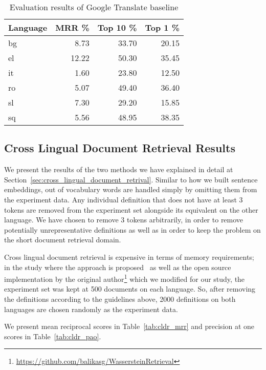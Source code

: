 \begin{table}[htbp]
    \centering
    \begin{tabulary}{1.0\linewidth}{L R R R}
        \toprule
        \textbf{Language} & \textbf{MRR \%} & \textbf{Top 10 \%} & \textbf{Top 1 \%} \\ \midrule
        bg & 8.73 & 33.70 & 20.15 \\
        el & 12.22 & 50.30 & 35.45 \\
        it & 1.60 & 23.80 & 12.50 \\
        ro & 5.07 & 49.40 & 36.40 \\
        sl & 7.30 & 29.20 & 15.85 \\
        sq & 5.56 & 48.95 & 38.35 \\ \bottomrule
    \end{tabulary}
    \caption{Evaluation results of Google Translate baseline}%
    \label{tab:google_translate_baseline}
\end{table}

\subsection{Cross Lingual Document Retrieval Results}%
\label{sub:cross_lingual_retrieval_results}

We present the results of the two methods we have explained in detail at Section~\ref{sec:cross_lingual_document_retrival}.
Similar to how we built sentence embeddings, out of vocabulary words are handled simply by omitting them from the experiment data.
Any individual definition that does not have at least 3 tokens are removed from the experiment set alongside its equivalent on the other language.
We have chosen to remove 3 tokens arbitrarily, in order to remove potentially unrepresentative definitions as well as in order to keep the problem on the short document retrieval domain.

Cross lingual document retrieval is expensive in terms of memory requirements; in the study where the approach is proposed~\cite{balikas_cross-lingual_2018} as well as the open source implementation by the original author\footnote{\url{https://github.com/balikasg/WassersteinRetrieval}} which we modified for our study, the experiment set was kept at 500 documents on each language.
So, after removing the definitions according to the guidelines above, 2000 definitions on both languages are chosen randomly as the experiment data.

We present mean reciprocal scores in Table~\ref{tab:cldr_mrr} and precision at one scores in Table~\ref{tab:cldr_pao}.


